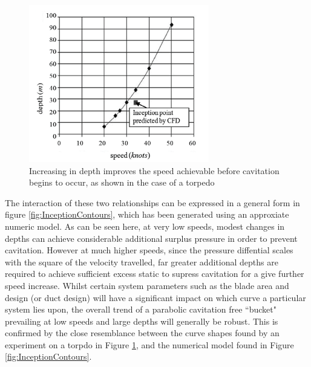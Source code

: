 \documentclass{article}\usepackage[]{graphicx}\usepackage[]{color}
\begin{document}
\begin{figure}[h]
\captionsetup{width=0.7\textwidth}
\includegraphics[width=0.7\textwidth, center]{InceptionDepth.png}
\caption{Increasing in depth improves the speed achievable before cavitation begins to occur, as shown in the case of a torpedo \parencite{suryanarayana2010cavitation}}
\label{fig:InceptionDepth.png}
\end{figure}

The interaction of these two relationships can be expressed in a general form in figure \ref{fig:InceptionContours}, which has been generated using an approxiate numeric model. As can be seen here, at very low speeds, modest changes in depths can achieve considerable additional surplus pressure in order to prevent cavitation.  However at much higher speeds, since the pressure diffential scales with the square of the velocity travelled, far greater additional depths are required to achieve sufficient excess static to supress cavitation for a give further speed increase.  Whilst certain system parameters such as the blade area and design (or duct design) will have a significant impact on which curve a particular system lies upon, the overall trend of a parabolic cavitation free ``bucket" prevailing at low speeds and large depths will generally be robust.  This is confirmed by the close resemblance between the curve shapes found by an experiment on a torpdo in Figure \ref{fig:InceptionDepth.png}, and the numerical model found in Figure \ref{fig:InceptionContours}.
\end{document}
